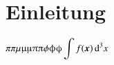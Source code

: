 \section{Einleitung}\label{sec:einleitung}

$\displaystyle \pi\mathrm \pi \mu \upmu \muup \uppi \piup \phi\upphi\phiup \int f(\vb* x)\dl^3x$
